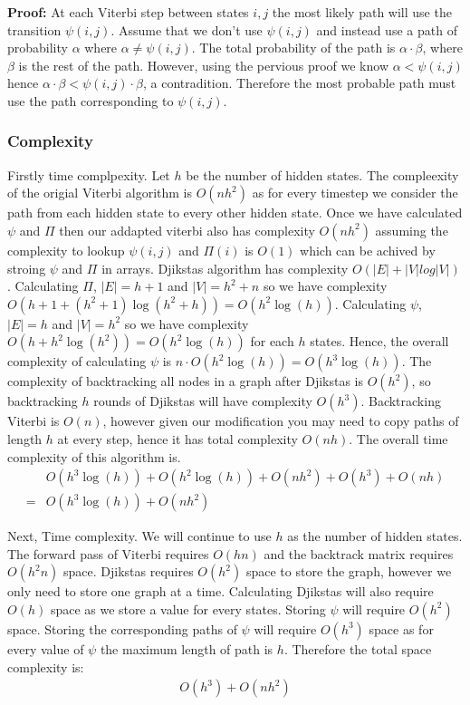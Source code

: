 \textbf{Proof:} At each Viterbi step between states $i,j$ the most likely path will use the transition $\psi(i,j)$. Assume that we don't use $\psi(i,j)$ and instead use a path of probability $\alpha$ where $\alpha \neq \psi(i,j)$. The total probability of the path is $\alpha \cdot \beta$, where $\beta$ is the rest of the path. However, using the pervious proof we know $\alpha < \psi(i,j)$ hence $\alpha \cdot \beta < \psi(i,j) \cdot \beta$, a contradition. Therefore the most probable path must use the path corresponding to $\psi(i,j)$.   



\subsubsection*{Complexity}
Firstly time complpexity. Let $h$ be the number of hidden states. The compleexity of the origial Viterbi algorithm is $O(nh^2)$ as for every timestep we consider the path from each hidden state to every other hidden state. Once we have calculated $\psi$ and $\Pi$ then our addapted viterbi also has complexity $O(nh^2)$ assuming the complexity to lookup $\psi(i,j)$ and $\Pi(i)$ is $O(1)$ which can be achived by stroing $\psi$ and $\Pi$ in arrays. Djikstas algorithm has complexity $O(|E|+|V|log|V|)$. Calculating $\Pi$, $|E| = h+1$ and $|V| = h^2 + n$ so we have complexity $O(h+1 + (h^2+1) \log(h^2+h)) = O(h^2 \log(h))$. Calculating $\psi$, $|E| = h$ and $|V| = h^2$ so we have complexity $O(h + h^2 \log(h^2)) = O(h^2 \log(h))$ for each $h$ states. Hence, the overall complexity of calculating $\psi$ is $n\cdot O(h^2 \log(h)) = O(h^3 \log(h))$. The complexity of backtracking all nodes in a graph after Djikstas is $O(h^2)$, so backtracking $h$ rounds of Djikstas will have complexity $O(h^3)$. Backtracking Viterbi is $O(n)$, however given our modification you may need to copy paths of length $h$ at every step, hence it has total complexity $O(nh)$. The overall time complexity of this algorithm is.
\begin{align*}
&O(h^3 \log(h)) + O(h^2 \log(h)) + O(nh^2) + O(h^3) + O(nh)\\
=& O(h^3 \log(h)) + O(nh^2)
\end{align*}

Next, Time complexity. We will continue to use $h$ as the number of hidden states. The forward pass of Viterbi requires $O(hn)$ and the backtrack matrix requires $O(h^2n)$ space. Djikstas requires $O(h^2)$ space to store the graph, however we only need to store one graph at a time. Calculating Djikstas will also require $O(h)$ space as we store a value for every states. Storing $\psi$ will require $O(h^2)$ space. Storing the corresponding paths of $\psi$ will require $O(h^3)$ space as for every value of $\psi$ the maximum length of path is $h$. Therefore the total space complexity is:
\begin{align*}
    O(h^3) + O(nh^2)
\end{align*} 



